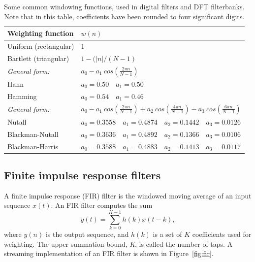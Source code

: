 \documentclass{ws-rv961x669}
\begin{document}
\begin{table}
	\caption{Some common windowing functions, used in digital filters and DFT filterbanks. Note that in this table, coefficients have been rounded to four significant digits. \label{tab:window_fns}}
	\begin{tabular}{l l }
	\hline
	Weighting function      & $w(n)$                        			\\
	\hline
	\hline
	Uniform  (rectangular)   &  1                           			\\
	Bartlett (triangular)    &  $1 - (|n| / (N-1)$               	\\
	\hline
	\emph{General form:}    & $a_0 - a_1~cos(\frac{2\pi n}{N-1})$ \\
	Hann                     & $a_0=0.50 \quad a_1 = 0.50$ 	\\
	Hamming             & $ a_0 = 0.54 \quad a_1 = 0.46$   	\\
	\hline
	
	 \emph{General form:} &$a_0 - a_1~cos(\frac{2\pi n}{N-1}) + a_2~cos(\frac{4\pi n}{N-1}) -
	 					   a_3~cos(\frac{6\pi n}{N-1}) $	 \\
	 Nutall          & $a_0=0.3558\quad a_1=0.4874\quad a_2=0.1442\quad a_3=0.0126$ \\
	 Blackman-Nutall & $a_0=0.3636\quad a_1=0.4892\quad a_2=0.1366\quad a_3=0.0106$ \\
	 Blackman-Harris & $a_0=0.3588\quad a_1=0.4883\quad a_2=0.1413\quad a_3=0.0117$ \\
	\hline
	\end{tabular}

\end{table}



\subsection{Finite impulse response filters}\label{sec:filters}

A finite impulse response (FIR) filter is the windowed moving average of an input sequence $x(t)$. An FIR filter computes the sum 
\begin{equation} 
y(t)=\sum_{k=0}^{K-1}h(k)x(t-k),\label{eq:FIR-filter}
\end{equation}
where $y(n)$ is the output sequence, and $h(k)$ is a set of $K$ coefficients used for weighting. The upper summation bound, \emph{K}, is called the number of taps.\emph{ }A streaming implementation of an FIR filter is shown in Figure~\ref{fig:fir}.
\end{document}
